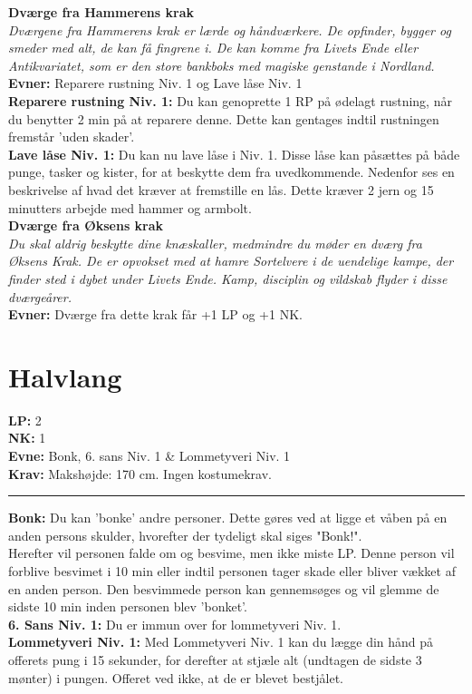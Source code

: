 \textbf{Dværge fra Hammerens krak}\\
\textit{Dværgene fra Hammerens krak er lærde og håndværkere. De opfinder, bygger og smeder med alt, de kan få fingrene i. De kan komme fra Livets Ende eller Antikvariatet, som er den store bankboks med magiske genstande i Nordland.}\\
\textbf{Evner:} Reparere rustning Niv. 1 og Lave låse Niv. 1\\
\textbf{Reparere rustning Niv. 1:} Du kan genoprette 1 RP på ødelagt rustning, når du benytter 2 min på at reparere denne. Dette kan gentages indtil rustningen fremstår 'uden skader'.\\
\textbf{Lave låse Niv. 1:} Du kan nu lave låse i Niv. 1. Disse låse kan påsættes på både punge, tasker og kister, for at beskytte dem fra uvedkommende. Nedenfor ses en beskrivelse af hvad det kræver at fremstille en lås. Dette kræver 2 jern og 15 minutters arbejde med hammer og armbolt.\\


\textbf{Dværge fra Øksens krak}\\
\textit{Du skal aldrig beskytte dine knæskaller, medmindre du møder en dværg fra Øksens Krak. De er opvokset med at hamre Sortelvere i de uendelige kampe, der finder sted i dybet under Livets Ende. Kamp, disciplin og vildskab flyder i disse dværgeårer.}\\
\textbf{Evner:} Dværge fra dette krak får +1 LP og +1 NK.

\section{Halvlang}
\begin{race*}[Halvlange]
\textbf{LP:} 2\\ 
\textbf{NK:} 1\\ 
\textbf{Evne:} Bonk, 6. sans Niv. 1 \& Lommetyveri Niv. 1\\
\textbf{Krav:} Makshøjde: 170 cm. Ingen kostumekrav.\\
\rule{\textwidth}{0.4pt}
\textbf{Bonk:} Du kan 'bonke' andre personer. Dette gøres ved at ligge et våben på en anden persons skulder, hvorefter der tydeligt skal siges "Bonk!".\\
Herefter vil personen falde om og besvime, men ikke miste LP. Denne person vil forblive besvimet i 10 min eller indtil personen tager skade eller bliver vækket af en anden person. Den besvimmede person kan gennemsøges og vil glemme de sidste 10 min inden personen blev 'bonket'.\\
\textbf{6. Sans Niv. 1:} Du er immun over for lommetyveri Niv. 1.\\
\textbf{Lommetyveri Niv. 1:} Med Lommetyveri Niv. 1 kan du lægge din hånd på offerets pung i 15 sekunder, for derefter at stjæle alt (undtagen de sidste 3 mønter) i pungen. Offeret ved ikke, at de er blevet bestjålet.\\
\end{race*}

